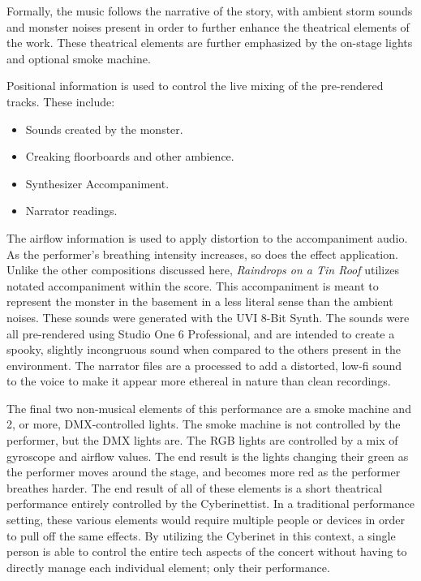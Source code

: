 Formally, the music follows the narrative of the story, with ambient storm sounds and monster noises present in order to further enhance the theatrical elements of the work. These theatrical elements are further emphasized by the on-stage lights and optional smoke machine.

Positional information is used to control the live mixing of the pre-rendered tracks. These include:
\begin{itemize}
    \item Sounds created by the monster.
    \item Creaking floorboards and other ambience.
    \item Synthesizer Accompaniment.
    \item Narrator readings.
\end{itemize}


The airflow information is used to apply distortion to the accompaniment audio. As the performer's breathing intensity increases, so does the effect application. Unlike the other compositions discussed here, \textit{Raindrops on a Tin Roof} utilizes notated accompaniment within the score. This accompaniment is meant to represent the monster in the basement in a less literal sense than the ambient noises. These sounds were generated with the UVI 8-Bit Synth. The sounds were all pre-rendered using Studio One 6 Professional, and are intended to create a spooky, slightly incongruous sound when compared to the others present in the environment. The narrator files are a processed to add a distorted, low-fi sound to the voice to make it appear more ethereal in nature than clean recordings. 

The final two non-musical elements of this performance are a smoke machine and 2, or more, DMX-controlled lights. The smoke machine is not controlled by the performer, but the DMX lights are. The RGB lights are controlled by a mix of gyroscope and airflow values. The end result is the lights changing their green as the performer moves around the stage, and becomes more red as the performer breathes harder. The end result of all of these elements is a short theatrical performance entirely controlled by the Cyberinettist. In a traditional performance setting, these various elements would require multiple people or devices in order to pull off the same effects. By utilizing the Cyberinet in this context, a single person is able to control the entire tech aspects of the concert without having to directly manage each individual element; only their performance.


